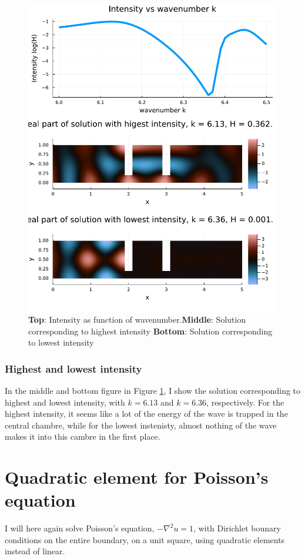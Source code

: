 \documentclass[aps, 12pt]{revtex4}
\begin{document}
\begin{figure}
    \includegraphics[width=\linewidth]{IvK_mx_mn.pdf}
    \caption{\textbf{Top}: Intensity as function of wavenumber.\textbf{Middle}: Solution corresponding to highest intensity \textbf{Bottom}: Solution corresponding to lowest intensity}
    \label{fig:HvK}
\end{figure}

\subsubsection{Highest and lowest intensity}
In the middle and bottom figure in Figure \ref{fig:HvK}, I show the solution corresponding to highest and lowest intensity, with $k=6.13$ and $k=6.36$, respectively. For the highest intensity, it seems like a lot of the energy of the wave is trapped in the central chambre, while for the lowest instenisty, almost nothing of the wave makes it into this cambre in the first place.

\newpage
\section*{Quadratic element for Poisson's equation}
I will here again solve Poisson's equation, $-\nabla^2 u=1$, with Dirichlet bounary conditions on the entire boundary, on a unit square, using quadratic elements instead of linear.
\end{document}
